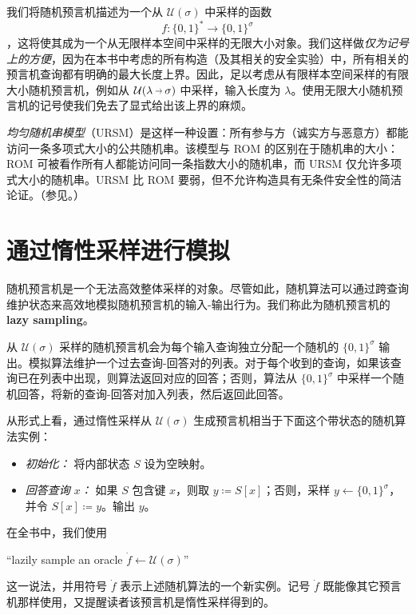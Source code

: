 \documentclass[american,singlepageview]{snargs-book-zh}
\newcommand{\DoQuote}[1]{``#1''}
\newcommand{\Bits}{\{0,1\}}
\newcommand{\DefineEqual}{\coloneqq}
\newcommand{\ROFunction}{f}
\newcommand{\RODistribution}[1]{\mathcal{U}(#1)}
\newcommand{\ROIODistribution}[2]{\mathcal{U}(#1 \scalebox{0.65}[1]{ $\to$ } #2)}
\newcommand{\ROQuery}{x}
\newcommand{\ROAnswer}{y}
\newcommand{\ROInputSize}{\lambda}
\newcommand{\ROOutputSize}{\sigma}
\newcommand{\Lazy}[1]{\dot{#1}}
\begin{document}
\begin{remark}[有限样本空间]
\label{remark:finite-in-constructions}
我们将随机预言机描述为一个从 $\RODistribution{\ROOutputSize}$ 中采样的函数
$$
\ROFunction \colon \Bits^{*} \to \Bits^{\ROOutputSize}
$$
，这将使其成为一个从无限样本空间中采样的无限大小对象。我们这样做\emph{仅为记号上的方便}，因为在本书中考虑的所有构造（及其相关的安全实验）中，所有相关的预言机查询都有明确的最大长度上界。因此，足以考虑从有限样本空间采样的有限大小随机预言机，例如从 $\ROIODistribution{\ROInputSize}{\ROOutputSize}$ 中采样，输入长度为 $\ROInputSize$。使用无限大小随机预言机的记号使我们免去了显式给出该上界的麻烦。
\end{remark}

\begin{remark}
\label{remark:rom-vs-urs}
\emph{均匀随机串模型}（URSM）是这样一种设置：所有参与方（诚实方与恶意方）都能访问一条多项式大小的公共随机串。该模型与 ROM 的区别在于随机串的大小：ROM 可被看作所有人都能访问同一条指数大小的随机串，而 URSM 仅允许多项式大小的随机串。URSM 比 ROM 要弱，但不允许构造具有无条件安全性的简洁论证。（参见。）
\end{remark}

\section{通过惰性采样进行模拟}
\label{section:rom-lazy-sampling}

随机预言机是一个无法高效整体采样的对象。尽管如此，随机算法可以通过跨查询维护状态来高效地模拟随机预言机的输入-输出行为。我们称此为随机预言机的\textbf{lazy sampling}。

从 $\RODistribution{\ROOutputSize}$ 采样的随机预言机会为每个输入查询独立分配一个随机的 $\Bits^{\ROOutputSize}$ 输出。模拟算法维护一个过去查询-回答对的列表。对于每个收到的查询，如果该查询已在列表中出现，则算法返回对应的回答；否则，算法从 $\Bits^{\ROOutputSize}$ 中采样一个随机回答，将新的查询-回答对加入列表，然后返回此回答。

从形式上看，通过惰性采样从 $\RODistribution{\ROOutputSize}$ 生成预言机相当于下面这个带状态的随机算法实例：
\begin{itemize}[noitemsep]
  \item \emph{初始化：} 将内部状态 $S$ 设为空映射。
  \item \emph{回答查询 $\ROQuery$：} 如果 $S$ 包含键 $\ROQuery$，则取 $\ROAnswer \DefineEqual S[\ROQuery]$；否则，采样 $\ROAnswer \gets \Bits^{\ROOutputSize}$，并令 $S[\ROQuery] \DefineEqual \ROAnswer$。输出 $\ROAnswer$。
\end{itemize}
在全书中，我们使用
\begin{center}
\DoQuote{lazily sample an oracle $\Lazy{\ROFunction} \gets \RODistribution{\ROOutputSize}$}
\end{center}
这一说法，并用符号 $\Lazy{\ROFunction}$ 表示上述随机算法的一个新实例。记号 $\Lazy{\ROFunction}$ 既能像其它预言机那样使用，又提醒读者该预言机是惰性采样得到的。
\end{document}
